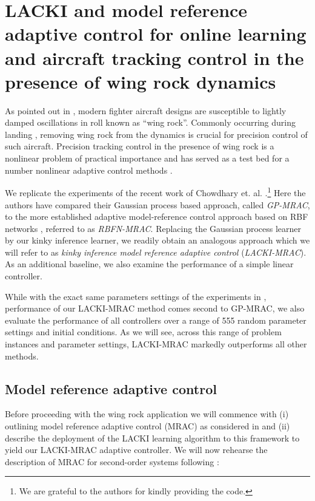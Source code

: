 \section{LACKI and model reference adaptive control for online learning and aircraft tracking control in the presence of wing rock dynamics }
\label{sec:KIMRAC}
As pointed out in \cite{chowdharyacc2013}, modern fighter aircraft designs are susceptible to lightly damped oscillations in roll known as ``wing rock''. Commonly occurring during landing \cite{Saad2000}, removing wing rock from the dynamics is crucial for precision control of such aircraft.
Precision tracking control in the presence of wing rock is a nonlinear problem of practical importance and has served as a test bed for a number nonlinear adaptive control methods \cite{Chowdhary2013,Monahemi1996,chowdharyacc2013}.

We replicate the experiments of the recent work of Chowdhary et. al. \cite{Chowdhary2013,ChowdharyCDC2013}.\footnote{We are grateful to the authors for kindly providing the code.}
Here the authors have compared their Gaussian process based approach, called \textit{GP-MRAC}, to the more established adaptive model-reference control approach based on RBF networks \cite{Sanner1992,Kim1998}, referred to as \textit{RBFN-MRAC}. Replacing the Gaussian process learner by our kinky inference learner, we readily obtain an analogous approach which we will refer to as \emph{kinky inference model reference adaptive control} (\textit{LACKI-MRAC}). As an additional baseline, we also examine the performance of a simple linear controller.

While with the exact same parameters settings of the experiments in \cite{Chowdhary2013}, performance of our LACKI-MRAC method comes second to GP-MRAC, we also evaluate the performance of all controllers over a range of 555 random parameter settings and initial conditions. As we will see, across this range of problem instances and parameter settings, LACKI-MRAC markedly outperforms all other methods.

\subsection{Model reference adaptive control}
Before proceeding with the wing rock application we will commence with (i) outlining model reference adaptive control (MRAC) \cite{astroemadaptivectrlbook2013} as considered in \cite{Chowdhary2013} and (ii) describe the deployment of the LACKI learning algorithm to this framework to yield our LACKI-MRAC adaptive controller. 
We will now rehearse the description of MRAC for second-order systems following \cite{Chowdhary2013}:

